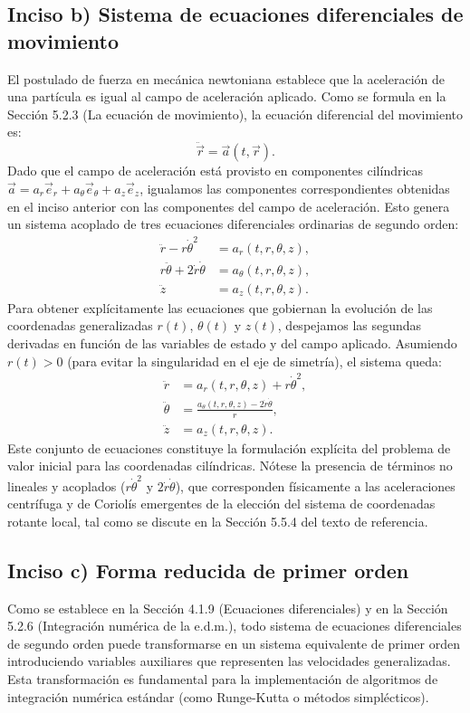 \documentclass[12pt, a4paper]{article}
\begin{document}
\subsection*{Inciso b) Sistema de ecuaciones diferenciales de movimiento}
El postulado de fuerza en mecánica newtoniana establece que la aceleración de una partícula es igual al campo de aceleración aplicado. Como se formula en la Sección 5.2.3 (La ecuación de movimiento), la ecuación diferencial del movimiento es:
$$
\ddot{\vec{r}} = \vec{a}(t, \vec{r}).
$$
Dado que el campo de aceleración está provisto en componentes cilíndricas $\vec{a} = a_r \vec{e}_r + a_\theta \vec{e}_\theta + a_z \vec{e}_z$, igualamos las componentes correspondientes obtenidas en el inciso anterior con las componentes del campo de aceleración. Esto genera un sistema acoplado de tres ecuaciones diferenciales ordinarias de segundo orden:
\begin{align*}
\ddot{r} - r\dot{\theta}^2 &= a_r(t, r, \theta, z), \\
r\ddot{\theta} + 2\dot{r}\dot{\theta} &= a_\theta(t, r, \theta, z), \\
\ddot{z} &= a_z(t, r, \theta, z).
\end{align*}
Para obtener explícitamente las ecuaciones que gobiernan la evolución de las coordenadas generalizadas $r(t)$, $\theta(t)$ y $z(t)$, despejamos las segundas derivadas en función de las variables de estado y del campo aplicado. Asumiendo $r(t) > 0$ (para evitar la singularidad en el eje de simetría), el sistema queda:
\begin{align*}
\ddot{r} &= a_r(t, r, \theta, z) + r\dot{\theta}^2, \\
\ddot{\theta} &= \frac{a_\theta(t, r, \theta, z) - 2\dot{r}\dot{\theta}}{r}, \\
\ddot{z} &= a_z(t, r, \theta, z).
\end{align*}
Este conjunto de ecuaciones constituye la formulación explícita del problema de valor inicial para las coordenadas cilíndricas. Nótese la presencia de términos no lineales y acoplados ($r\dot{\theta}^2$ y $2\dot{r}\dot{\theta}$), que corresponden físicamente a las aceleraciones centrífuga y de Coriolís emergentes de la elección del sistema de coordenadas rotante local, tal como se discute en la Sección 5.5.4 del texto de referencia.

\subsection*{Inciso c) Forma reducida de primer orden}
Como se establece en la Sección 4.1.9 (Ecuaciones diferenciales) y en la Sección 5.2.6 (Integración numérica de la e.d.m.), todo sistema de ecuaciones diferenciales de segundo orden puede transformarse en un sistema equivalente de primer orden introduciendo variables auxiliares que representen las velocidades generalizadas. Esta transformación es fundamental para la implementación de algoritmos de integración numérica estándar (como Runge-Kutta o métodos simplécticos).
\end{document}
